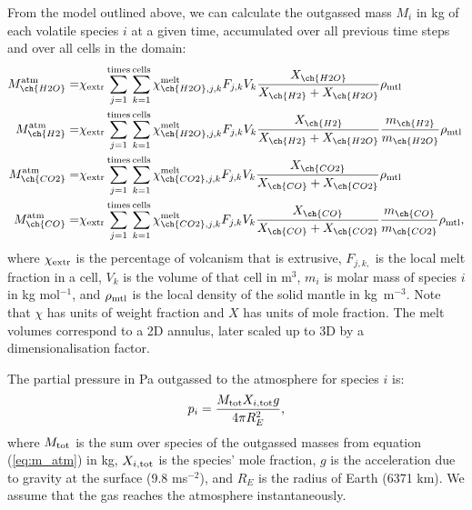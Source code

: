 \documentclass[3p,authoryear]{elsarticle}
\begin{document}
From the model outlined above, we can calculate the outgassed mass $M_i$ in kg of each volatile species $i$ at a given time, accumulated over all previous time steps and over all cells in the domain:
{%
    \begin{equation}\begin{split}
    M_{\ch{H2O}}^{\rm atm} = &\chi_{\rm extr} \sum\limits_{j=1}^{\rm times} \sum\limits_{k=1}^{\rm cells} \chi_{\ch{H2O}, j, k}^{\rm melt} F_{j,k} V_{k} \frac{X_{\ch{H2O}}}{X_{\ch{H2}}+X_{\ch{H2O}}} \rho_{\rm mtl}
    \\
    M_{\ch{H2}}^{\rm atm} = &\chi_{\rm extr} \sum\limits_{j=1}^{\rm times} \sum\limits_{k=1}^{\rm cells} \chi_{\ch{H2O}, j, k}^{\rm melt} F_{j,k} V_{k} \frac{X_{\ch{H2}}}{X_{\ch{H2}}+X_{\ch{H2O}}} \frac{m_{\ch{H2}}}{m_{\ch{H2O}}} \rho_{\rm mtl}
    \\
    M_{\ch{CO2}}^{\rm atm} = &\chi_{\rm extr} \sum\limits_{j=1}^{\rm times} \sum\limits_{k=1}^{\rm cells} \chi_{\ch{CO2}, j, k}^{\rm melt} F_{j,k} V_{k} \frac{X_{\ch{CO2}}}{X_{\ch{CO}}+X_{\ch{CO2}}}\rho_{\rm mtl}
    \\
    M_{\ch{CO}}^{\rm atm} = &\chi_{\rm extr} \sum\limits_{j=1}^{\rm times} \sum\limits_{k=1}^{\rm cells} \chi_{\ch{CO2}, j, k}^{\rm melt} F_{j,k} V_{k} \frac{X_{\ch{CO}}}{X_{\ch{CO}}+X_{\ch{CO2}}} \frac{m_{\ch{CO}}}{m_{\ch{CO2}}} \rho_{\rm mtl},
\end{split}\label{eq:m_atm}
\end{equation}}
where $\chi_{\rm extr}$ is the percentage of volcanism that is extrusive, $F_{j,k,}$ is the local melt fraction in a cell, $V_{k}$ is the volume of that cell in m$^{3}$, $m_i$ is molar mass of species $i$ in kg mol$^{-1}$, and $\rho_{\rm mtl}$ is the local density of the solid mantle in kg~m$^{-3}$. Note that $\chi$ has units of weight fraction and $X$ has units of mole fraction. The melt volumes correspond to a 2D annulus, later scaled up to 3D by a dimensionalisation factor.  

The partial pressure in Pa outgassed to the atmosphere for species $i$ is: 
\begin{equation} \label{eq:partpresh}
p _i= \frac{M_{\rm tot} X_{i,{\rm tot}} g}{4\pi R_E^2},
\end{equation}
where $M_{\rm tot}$ is the sum over species of the outgassed masses from equation (\ref{eq:m_atm}) in kg, $X_{i, {\rm tot}}$ is the species' mole fraction, $g$ is the acceleration due to gravity at the surface (9.8 ms$^{-2}$), and $R_E$ is the radius of Earth (6371 km). We assume that the gas reaches the atmosphere instantaneously. 
\end{document}
